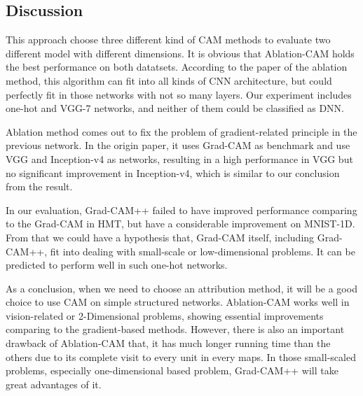 \documentclass[conference]{IEEEtran}
\begin{document}
\subsection{Discussion}

This approach choose three different kind of CAM methods to evaluate two different model with different dimensions. It is obvious that Ablation-CAM holds the best performance on both datatsets. According to the paper of the ablation method, this algorithm can fit into all kinds of CNN architecture, but could perfectly fit in those networks with not so many layers. Our experiment includes one-hot and VGG-7 networks, and neither of them could be classified as DNN.\par
Ablation method comes out to fix the problem of gradient-related principle in the previous network. In the origin paper, it uses Grad-CAM as benchmark and use VGG and Inception-v4 as networks, resulting in a high performance in VGG but no significant improvement in Inception-v4, which is similar to our conclusion from the result.\par
In our evaluation, Grad-CAM++ failed to have improved performance comparing to the Grad-CAM in HMT, but have a considerable improvement on MNIST-1D. From that we could have a hypothesis that, Grad-CAM itself, including Grad-CAM++, fit into dealing with small-scale or low-dimensional problems. It can be predicted to perform well in such one-hot networks.\par
As a conclusion, when we need to choose an attribution method, it will be a good choice to use CAM on simple structured networks. Ablation-CAM works well in vision-related or 2-Dimensional problems, showing essential improvements comparing to the gradient-based methods. However, there is also an important drawback of Ablation-CAM that, it has much longer running time than the others due to its complete visit to every unit in every maps. In those small-scaled problems, especially one-dimensional based problem, Grad-CAM++ will take great advantages of it.
\end{document}
